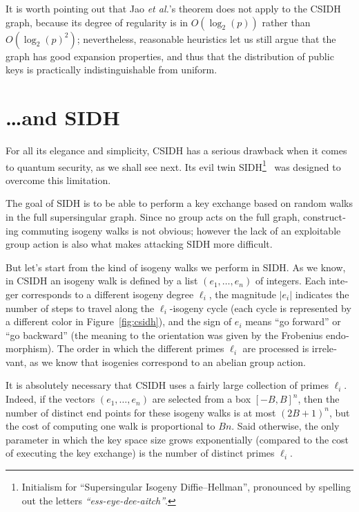 \begin{otherlanguage}{english}
  It is worth pointing out that Jao \emph{et al.}'s theorem does not
  apply to the CSIDH graph, because its degree of regularity is in
  $O(\log_2(p))$ rather than $O(\log_2(p)^2)$; nevertheless,
  reasonable heuristics let us still argue that the graph has good
  expansion properties, and thus that the distribution of public keys
  is practically indistinguishable from uniform.
  
\section{\dots and SIDH}
For all its elegance and simplicity, CSIDH has a serious drawback when
it comes to quantum security, as we shall see next. Its evil twin
SIDH\footnote{Initialism for ``Supersingular Isogeny Diffie--Hellman'',
  pronounced by spelling out the letters
  \emph{``ess-eye-dee-aitch''}.}~\cite{jao+defeo2011,defeo+jao+plut12}
was designed to overcome this limitation.

The goal of SIDH is to be able to perform a key exchange based on
random walks in the full supersingular graph. Since no group acts on
the full graph, constructing commuting isogeny walks is not obvious;
however the lack of an exploitable group action is also what makes attacking
SIDH more difficult.

But let's start from the kind of isogeny walks we perform in SIDH. As
we know, in CSIDH an isogeny walk is defined by a list
$(e_1,\dots,e_n)$ of integers. Each integer corresponds to a different
isogeny degree $\ell_i$, the magnitude $|e_i|$ indicates the number of
steps to travel along the $\ell_i$-isogeny cycle (each cycle is
represented by a different color in Figure~\ref{fig:csidh}), and the
sign of $e_i$ means ``go forward'' or ``go backward'' (the meaning to
the orientation was given by the Frobenius endomorphism).  The order
in which the different primes $\ell_i$ are processed is irrelevant, as
we know that isogenies correspond to an abelian group action.

It is absolutely necessary that CSIDH uses a fairly large collection
of primes $\ell_i$. Indeed, if the vectors $(e_1,\dots,e_n)$ are selected from a
box $[-B,B]^n$, then the number of distinct end points for these
isogeny walks is at most $(2B+1)^n$, but the cost of computing one
walk is proportional to $Bn$. Said otherwise, the only parameter in
which the key space size grows exponentially (compared to the cost of
executing the key exchange) is the number of distinct primes $\ell_i$.


\end{otherlanguage}
